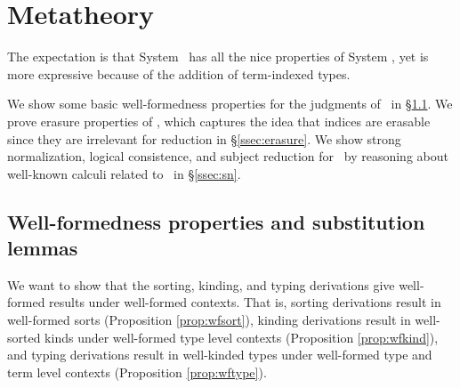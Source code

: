 \section{Metatheory}
\label{sec:theory}
The expectation is that System \Fi\ has all the nice properties of System \Fw,
yet is more expressive because of the addition of term-indexed types.

We show some basic well-formedness properties for
the judgments of \Fi\ in \S\ref{ssec:wf}.
We prove erasure properties of \Fi, which captures the idea that indices are
erasable since they are irrelevant for reduction in \S\ref{ssec:erasure}.
We show strong normalization, logical consistence, and subject reduction for
\Fi\ by reasoning about well-known calculi related to \Fi\ in \S\ref{ssec:sn}.

\subsection{Well-formedness properties and substitution lemmas}
\label{ssec:wf}
We want to show that the sorting, kinding, and typing derivations give
well-formed results under well-formed contexts. That is, sorting derivations
result in well-formed sorts (Proposition \ref{prop:wfsort}),
kinding derivations result in well-sorted kinds under well-formed
type level contexts (Proposition \ref{prop:wfkind}), and typing derivations
result in well-kinded types under well-formed type and term level contexts
(Proposition \ref{prop:wftype}).

